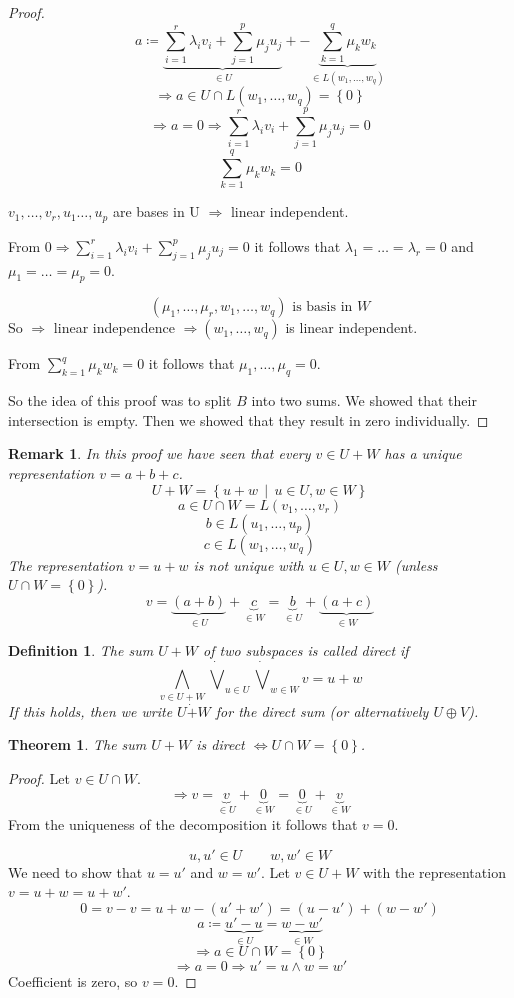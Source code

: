 \documentclass[a4paper,landscape,twocolumn]{article}
\newcommand\set[1]{\left\{#1\right\}}
\newcommand\setdef[2]{\left\{#1\,\middle|\,#2\right\}}
\newtheorem{theorem}{Theorem}
\newtheorem{defi}{Definition}
\newtheorem{rem}{Remark}
\begin{document}
\begin{proof}
  \[ a \coloneqq \underbrace{\sum_{i=1}^r \lambda_i v_i + \sum_{j=1}^p \mu_j u_j}_{\in U} + -\underbrace{\sum_{k=1}^q \mu_k w_k}_{\in L(w_1, \dots, w_q)} \]
  \[ \Rightarrow a \in U \cap L(w_1, \dots, w_q) = \set{0} \]
  \[ \Rightarrow a = 0 \Rightarrow \sum_{i=1}^r \lambda_i v_i + \sum_{j=1}^p \mu_j u_j = 0 \]
  \[ \sum_{k=1}^q \mu_k w_k = 0 \]

  $v_1, \dots, v_r, u_1 \dots, u_p$ are bases in U $\Rightarrow$ linear independent.

  From $0 \Rightarrow \sum_{i=1}^r \lambda_i v_i + \sum_{j=1}^p \mu_j u_j = 0$ it follows
  that $\lambda_1 = \dots = \lambda_r = 0$ and $\mu_1 = \dots = \mu_p = 0$.

  \[ (\mu_1, \dots, \mu_r, w_1, \dots, w_q) \text{ is basis in } W \]
  So $\Rightarrow$ linear independence $\Rightarrow (w_1, \dots, w_q)$ is linear independent.

  From $\sum_{k=1}^q \mu_k w_k = 0$ it follows that $\mu_1, \dots, \mu_q = 0$.

  So the idea of this proof was to split $B$ into two sums.
  We showed that their intersection is empty.
  Then we showed that they result in zero individually.
\end{proof}

\begin{rem}
  In this proof we have seen that every $v \in U + W$ has a unique representation $v = a + b + c$.
  \[ U+W = \setdef{u+w}{u \in U, w \in W} \]
  \[ a \in U \cap W = L(v_1, \dots, v_r) \]
  \[ b \in L(u_1, \dots, u_p) \]
  \[ c \in L(w_1, \dots, w_q) \]
  The representation $v = u + w$ is \emph{not} unique with $u \in U, w \in W$ (unless $U \cap W = \set{0}$).
  \[ v = \underbrace{(a + b)}_{\in U} + \underbrace{c}_{\in W} = \underbrace{b}_{\in U} + \underbrace{(a + c)}_{\in W} \]
\end{rem}

\begin{defi}
  The sum $U+W$ of two subspaces is called \emph{direct} if
  \[ \bigwedge_{v \in U+W} \dot\bigvee_{u\in U} \dot\bigvee_{w \in W} v = u + w \]
  If this holds, then we write $U \dot{+} W$ for the direct sum (or alternatively $U \oplus V$).
\end{defi}

\begin{theorem}
  \label{satz-4-8}
  The sum $U+W$ is direct $\Leftrightarrow U \cap W = \set{0}$.
\end{theorem}
\begin{proof}
  Let $v \in U \cap W$.
  \[ \Rightarrow v = \underbrace{v}_{\in U} + \underbrace{0}_{\in W} = \underbrace{0}_{\in U} + \underbrace{v}_{\in W} \]
  From the uniqueness of the decomposition it follows that $v = 0$.

  \[ u, u' \in U \qquad w, w' \in W\]
  We need to show that $u = u'$ and $w = w'$.
  Let $v \in U + W$ with the representation $v = u + w = u + w'$.
  \[ 0 = v - v = u + w - (u' + w') = (u - u') + (w - w') \]
  \[ a \coloneqq \underbrace{u' - u}_{\in U} = \underbrace{w - w'}_{\in W} \]
  \[ \Rightarrow a \in U \cap W = \set{0} \]
  \[ \Rightarrow a = 0 \Rightarrow u' = u \land w = w' \]
  Coefficient is zero, so $v = 0$.
\end{proof}
\end{document}
